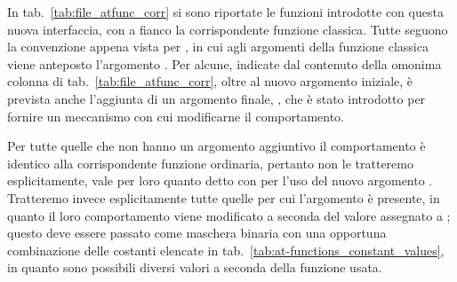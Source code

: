 In tab.~\ref{tab:file_atfunc_corr} si sono riportate le funzioni introdotte
con questa nuova interfaccia, con a fianco la corrispondente funzione
classica. Tutte seguono la convenzione appena vista per , in cui
agli argomenti della funzione classica viene anteposto l'argomento
. Per alcune, indicate dal contenuto della omonima colonna di
tab.~\ref{tab:file_atfunc_corr}, oltre al nuovo argomento iniziale, è prevista
anche l'aggiunta di un argomento finale, , che è stato introdotto
per fornire un meccanismo con cui modificarne il comportamento.

Per tutte quelle che non hanno un argomento aggiuntivo il comportamento è
identico alla corrispondente funzione ordinaria, pertanto non le tratteremo
esplicitamente, vale per loro quanto detto con  per l'uso del
nuovo argomento . Tratteremo invece esplicitamente tutte quelle
per cui l'argomento è presente, in quanto il loro comportamento viene
modificato a seconda del valore assegnato a ; questo deve essere
passato come maschera binaria con una opportuna combinazione delle costanti
elencate in tab.~\ref{tab:at-functions_constant_values}, in quanto sono
possibili diversi valori a seconda della funzione usata.

